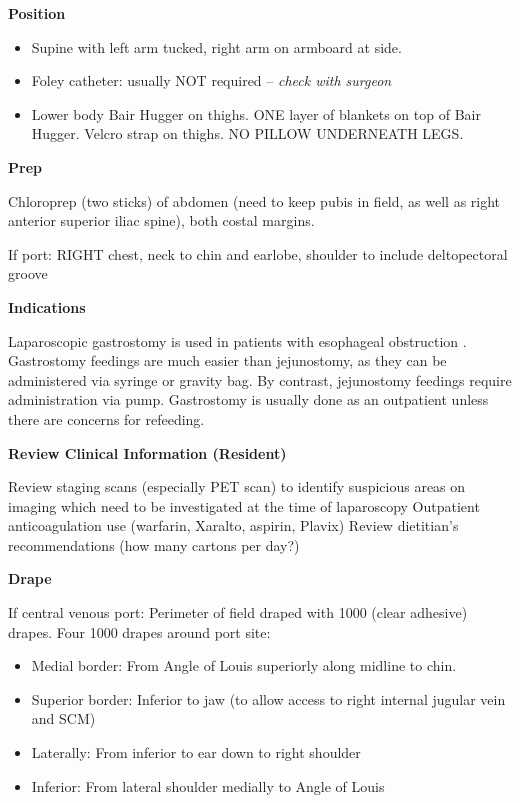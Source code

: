 \documentclass[
]{book}
\providecommand{\tightlist}{%
  \setlength{\itemsep}{0pt}\setlength{\parskip}{0pt}}
\begin{document}
\textbf{Position}

\begin{itemize}
\tightlist
\item
  Supine with left arm tucked, right arm on armboard at side.
\item
  Foley catheter: usually NOT required -- \emph{check with surgeon}
\item
  Lower body Bair Hugger on thighs. ONE layer of blankets on top of Bair Hugger. Velcro strap on thighs. NO PILLOW UNDERNEATH LEGS.
\end{itemize}

\textbf{Prep}

Chloroprep (two sticks) of abdomen (need to keep pubis in field, as well as right anterior superior iliac spine), both costal margins.

If port: RIGHT chest, neck to chin and earlobe, shoulder to include deltopectoral groove

\textbf{Indications}

Laparoscopic gastrostomy is used in patients with esophageal obstruction . Gastrostomy feedings are much easier than jejunostomy, as they can be administered via syringe or gravity bag. By contrast, jejunostomy feedings require administration via pump. Gastrostomy is usually done as an outpatient unless there are concerns for refeeding.

\textbf{Review Clinical Information (Resident)}

Review staging scans (especially PET scan) to identify suspicious areas on imaging which need to be investigated at the time of laparoscopy
Outpatient anticoagulation use (warfarin, Xaralto, aspirin, Plavix)
Review dietitian's recommendations (how many cartons per day?)

\textbf{Drape}

If central venous port: Perimeter of field draped with 1000 (clear adhesive) drapes. Four 1000 drapes around port site:

\begin{itemize}
\tightlist
\item
  Medial border: From Angle of Louis superiorly along midline to chin.
\item
  Superior border: Inferior to jaw (to allow access to right internal jugular vein and SCM)
\item
  Laterally: From inferior to ear down to right shoulder
\item
  Inferior: From lateral shoulder medially to Angle of Louis
\end{itemize}
\end{document}
